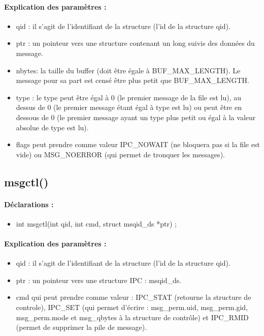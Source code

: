 \documentclass{article}[12pt]
\begin{document}
\paragraph{Explication des paramètres : }
\begin{itemize}
\item qid : il s'agit de l'identifiant de la structure (l'id de la structure qid). 
\item ptr : un pointeur vers une structure contenant un long suivis des données du message.
\item nbytes: la taille du buffer (doit être égale à BUF\_MAX\_LENGTH). Le message pour sa part est censé être plus petit que BUF\_MAX\_LENGTH.
\item type : le type peut être égal à 0 (le premier message de la file est lu), au dessus de 0 (le premier message étant égal à type est lu) ou peut être en dessous de 0 (le premier message ayant un type plus petit ou égal à la valeur absolue de type est lu).
\item flags peut prendre comme valeur IPC\_NOWAIT (ne bloquera pas si la file est vide) ou MSG\_NOERROR (qui permet de tronquer les messages).
\end{itemize}
\subsection{msgctl()}
\paragraph{Déclarations : }
\begin{itemize}
	\item int msgctl(int qid, int cmd, struct msqid\_ds *ptr)	; 
\end{itemize}
\paragraph{Explication des paramètres : }
\begin{itemize}
\item qid : il s'agit de l'identifiant de la structure (l'id de la structure qid). 
\item ptr : un pointeur vers une structure IPC :  msqid\_ds.
\item cmd qui peut prendre comme valeur : IPC\_STAT (retourne la structure de controle), IPC\_SET (qui permet d'écrire : msg\_perm.uid, msg\_perm.gid, msg\_perm.mode et msg\_qbytes à la structure de contrôle) et IPC\_RMID (permet de supprimer la pile de message). 
\end{itemize}
\end{document}
